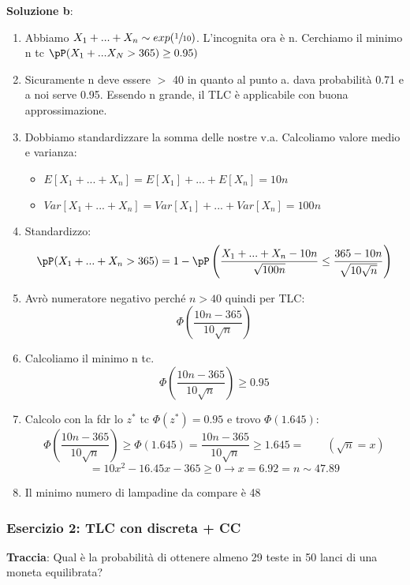 \ind \textbf{Soluzione b}:
\begin{enumerate}
    \item Abbiamo $X_1 + ... + X_n \sim exp(\sfrac{1}{10})$. L'incognita ora è n. Cerchiamo il minimo n  tc $ \pP(X_1 + ... X_N > 365) \geq 0.95)$
    \item Sicuramente n deve essere $>$ 40 in quanto al punto a. dava probabilità 0.71 e a noi serve 0.95. Essendo n grande, il TLC è applicabile con buona approssimazione.
    \item Dobbiamo standardizzare la somma delle nostre v.a. Calcoliamo valore medio e varianza:
        \begin{itemize}
            \item $E[X_1 + ... + X_n] = E[X_1] + ... + E[X_n] = 10n$
            \item $Var[X_1 + ... + X_n] = Var[X_1] + ... + Var[X_n] = 100n$
        \end{itemize}
    \item Standardizzo: $$ \pP(X_1 + ... + X_n > 365) = 1 - \pP \left( \dfrac{X_1 + ... + X_{n} - 10n}{\sqrt{100n}} \leq \dfrac{365 - 10n}{\sqrt{10\sqrt{n}}} \right)$$
    \item Avrò numeratore negativo perché $n>40$ quindi per TLC: $$\Phi\left(\frac{10n - 365}{10 \sqrt{n}}\right)$$
    \item Calcoliamo il minimo n tc. $$\Phi \left(\frac{10n - 365}{10 \sqrt{n}}\right) \geq 0.95$$
    \item Calcolo con la fdr lo $z^*$ tc $\Phi(z^*) = 0.95$ e trovo $\Phi(1.645)$: $$\Phi\left( \frac{10n - 365}{10 \sqrt{n}}\right) \geq \Phi(1.645) =  \frac{10n - 365}{10 \sqrt{n}} \geq 1.645= \qquad (\sqrt{n} = x)$$  $$= 10x^2 - 16.45x - 365 \geq 0 \xrightarrow{} x=6.92= n \sim 47.89$$ 
    \item Il minimo numero di lampadine da compare è 48
\end{enumerate}

\subsubsection{Esercizio 2: TLC con discreta + CC }

\textbf{Traccia}: Qual è la probabilità di ottenere almeno 29 teste in 50 lanci di una moneta equilibrata? \n

